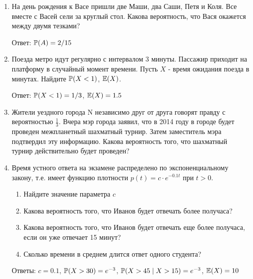 \documentclass[12pt, a4paper]{article}\usepackage[]{graphicx}\usepackage[]{color}
\begin{document}
\begin{enumerate}
\item На день рождения к Васе пришли две Маши, два Саши, Петя и Коля. Все вместе с Васей сели за круглый стол. Какова вероятность, что Вася окажется между двумя тезками?

Ответ: $\P(A)=2/15$

\item Поезда метро идут регулярно с интервалом 3 минуты. Пассажир
приходит на платформу в случайный момент времени. Пусть $X$ -
время ожидания поезда в минутах. Найдите $\P(X<1)$, $\E(X)$.

Ответ: $\P(X<1)=1/3$, $\E(X)=1.5$

\item Жители уездного города N независимо друг от друга говорят правду с вероятностью $\frac{1}{3}$. Вчера мэр города заявил, что в 2014 году в городе будет проведен межпланетный шахматный турнир. Затем заместитель мэра подтвердил эту информацию.
Какова вероятность того, что шахматный турнир действительно будет проведен?

\item Время устного ответа на экзамене распределено по экспоненциальному закону, т.е. имеет функцию плотности $p(t)=c\cdot e^{-0.1t}$ при $t>0$.
\begin{enumerate}
\item Найдите значение параметра $c$
\item Какова вероятность того, что Иванов будет отвечать более получаса?
\item Какова вероятность того, что Иванов будет отвечать еще более получаса, если он уже отвечает 15 минут?
\item Сколько времени в среднем длится ответ одного студента?
\end{enumerate}

Ответы: $c=0.1$, $\P(X>30)=e^{-3}$, $\P(X>45\mid X>15)=e^{-3}$, $\E(X)=10$





\end{enumerate}
\end{document}
